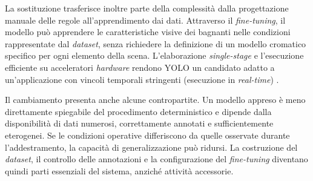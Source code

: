 La sostituzione trasferisce inoltre parte della complessità dalla progettazione manuale delle regole all'apprendimento dai dati. Attraverso il \textit{fine-tuning}, il modello può apprendere le caratteristiche visive dei bagnanti nelle condizioni rappresentate dal \textit{dataset}, senza richiedere la definizione di un modello cromatico specifico per ogni elemento della scena. L'elaborazione \textit{single-stage} e l'esecuzione efficiente su acceleratori \textit{hardware} rendono YOLO un candidato adatto a un'applicazione con vincoli temporali stringenti (esecuzione in \emph{real-time}) \cite{Redmon2016YOLO}.

Il cambiamento presenta anche alcune contropartite. Un modello appreso è meno direttamente spiegabile del procedimento deterministico e dipende dalla disponibilità di dati numerosi, correttamente annotati e sufficientemente eterogenei. Se le condizioni operative differiscono da quelle osservate durante l'addestramento, la capacità di generalizzazione può ridursi. La costruzione del \textit{dataset}, il controllo delle annotazioni e la configurazione del \textit{fine-tuning} diventano quindi parti essenziali del sistema, anziché attività accessorie.


